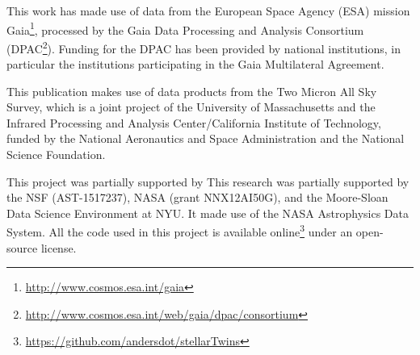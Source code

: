 \documentclass[modern]{aastex61}
\newcommand{\acronym}[1]{{\small{#1}}}
\begin{document}
This work has made use of data from the European Space Agency (\acronym{ESA})
mission Gaia\footnote{\url{http://www.cosmos.esa.int/gaia}}, processed by the Gaia
Data Processing and Analysis Consortium (\acronym{DPAC}\footnote{\url{http://www.cosmos.esa.int/web/gaia/dpac/consortium}}). Funding for the
\acronym{DPAC} has been provided by national institutions, in particular the
institutions participating in the Gaia Multilateral Agreement.

This publication makes use of data products from the Two Micron All
Sky Survey, which is a joint project of the
University of Massachusetts and the Infrared Processing and Analysis
Center/California Institute of Technology, funded by the National
Aeronautics and Space Administration and the National Science
Foundation.

This project was partially supported by This research was partially supported by
  the \acronym{NSF} (\acronym{AST-1517237}),
  \acronym{NASA} (grant \acronym{NNX12AI50G}),
  and the Moore-Sloan Data Science Environment at \acronym{NYU}.
It made use of the \acronym{NASA} Astrophysics Data System.
All the code used in this project is available online\footnote{\url{https://github.com/andersdot/stellarTwins}} under an open-source license.




\clearpage
\end{document}
